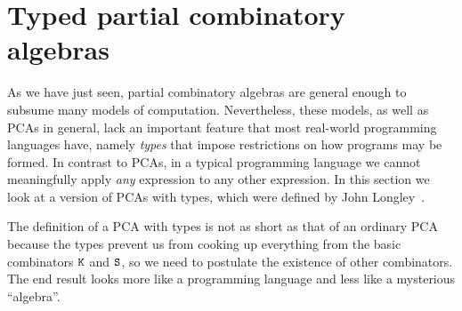 
\section{Typed partial combinatory algebras}
\label{sec:tpcas}

As we have just seen, partial combinatory algebras are general enough
to subsume many models of computation. Nevertheless, these models, as
well as PCAs in general, lack an important feature that most
real-world programming languages have, namely \emph{types} that impose
restrictions on how programs may be formed. In contrast to PCAs, in a
typical programming language we cannot meaningfully apply \emph{any}
expression to any other expression. In this section we look at a
version of PCAs with types, which were defined by John
Longley~\cite{longley99:_unify_typed_and_untyp_realiz}.

The definition of a PCA with types is not as short as that of an
ordinary PCA because the types prevent us from cooking up everything
from the basic combinators $\mathtt{K}$ and $\mathtt{S}$, so we need to
postulate the existence of other combinators. The end result looks
more like a programming language and less like a mysterious
``algebra''.

